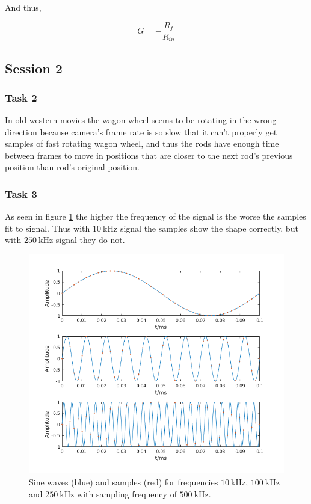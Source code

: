 \documentclass[12pt]{article}
\begin{document}
And thus,

\begin{equation}
G = -\frac{R_f}{R_{in}}
\label{eqn:G}
\end{equation}

\subsection{Session 2}

\subsubsection{Task 2}

In old western movies the wagon wheel seems to be rotating in the wrong direction because camera's frame rate is so slow that it can't properly get samples of fast rotating wagon wheel, and thus the rods have enough time between frames to move in positions that are closer to the next rod's previous position than rod's original position.

\subsubsection{Task 3}

As seen in figure \ref{fig:samp} the higher the frequency of the signal is the worse the samples fit to signal. Thus with $\SI{10}{\kilo\hertz}$ signal the samples show the shape correctly, but with $\SI{250}{\kilo\hertz}$ signal they do not.

\begin{figure}[!ht]
\centering
\includegraphics[width = \textwidth]{kuvat/sampling.png}
\caption{Sine waves (blue) and samples (red) for frequencies $\SI{10}{\kilo\hertz}$, $\SI{100}{\kilo\hertz}$ and $\SI{250}{\kilo\hertz}$ with sampling frequency of $\SI{500}{\kilo\hertz}$.}
\label{fig:samp}
\end{figure}
\end{document}
